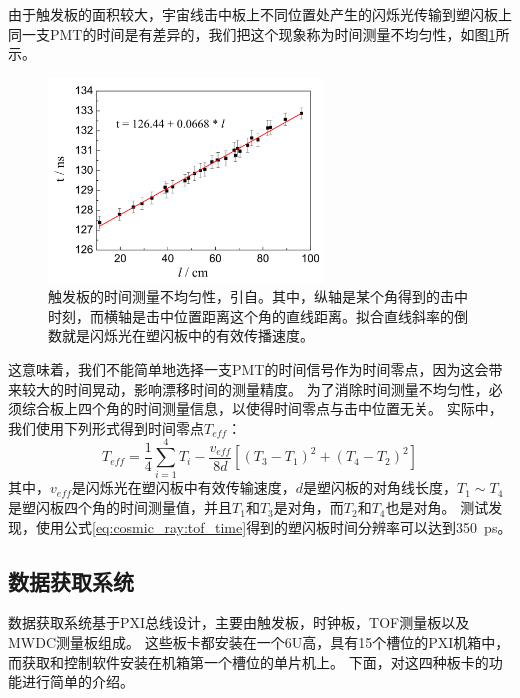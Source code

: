 由于触发板的面积较大，宇宙线击中板上不同位置处产生的闪烁光传输到塑闪板上同一支PMT的时间是有差异的，我们把这个现象称为时间测量不均匀性，如图\ref{fig:cosmic_ray:tof_timeVSposition}所示。
\begin{figure}[htbp]
	\centering
	\includegraphics[width=0.65\textwidth]{chap/cosmic_ray/fig/tof_timeVSposition.png}
	\caption{触发板的时间测量不均匀性，引自\cite{tang_large_2015}。其中，纵轴是某个角得到的击中时刻，而横轴是击中位置距离这个角的直线距离。拟合直线斜率的倒数就是闪烁光在塑闪板中的有效传播速度。}
	\label{fig:cosmic_ray:tof_timeVSposition}
\end{figure}
这意味着，我们不能简单地选择一支PMT的时间信号作为时间零点，因为这会带来较大的时间晃动，影响漂移时间的测量精度。
为了消除时间测量不均匀性，必须综合板上四个角的时间测量信息，以使得时间零点与击中位置无关。
实际中，我们使用下列形式\cite{annand_large_1987}得到时间零点$T_{eff}$：
\begin{equation}
	T_{eff} = \frac{1}{4}\sum^4_{i=1}T_i - \frac{v_{eff}}{8d}[(T_3-T_1)^2+(T_4-T_2)^2]
	\label{eq:cosmic_ray:tof_time}
\end{equation}
其中，$v_{eff}$是闪烁光在塑闪板中有效传输速度，$d$是塑闪板的对角线长度，$T_1\sim T_4$是塑闪板四个角的时间测量值，并且$T_1和T_3$是对角，而$T_2和T_4$也是对角。
测试发现，使用公式\ref{eq:cosmic_ray:tof_time}得到的塑闪板时间分辨率可以达到\SI{350}{\pico\second}\cite{tang_large_2015}。

\subsection{数据获取系统}
\label{sec:cosmic_ray:daq_system}
数据获取系统基于PXI总线设计，主要由触发板，时钟板，TOF测量板以及MWDC测量板组成。
这些板卡都安装在一个6U高，具有15个槽位的PXI机箱中\cite{TODO}，而获取和控制软件安装在机箱第一个槽位的单片机上。
下面，对这四种板卡的功能进行简单的介绍。

